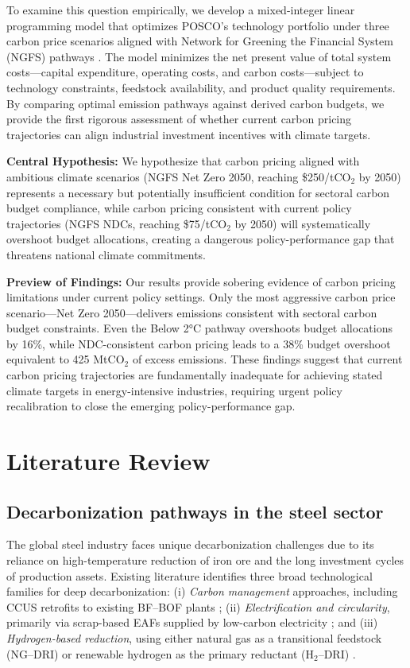 \documentclass[preprint,5p,authoryear]{elsarticle}
\begin{document}
To examine this question empirically, we develop a mixed-integer linear programming model that optimizes POSCO's technology portfolio under three carbon price scenarios aligned with Network for Greening the Financial System (NGFS) pathways \citep{NGFS2024}. The model minimizes the net present value of total system costs—capital expenditure, operating costs, and carbon costs—subject to technology constraints, feedstock availability, and product quality requirements. By comparing optimal emission pathways against derived carbon budgets, we provide the first rigorous assessment of whether current carbon pricing trajectories can align industrial investment incentives with climate targets.

\textbf{Central Hypothesis:} We hypothesize that carbon pricing aligned with ambitious climate scenarios (NGFS Net Zero 2050, reaching \$250/tCO$_2$ by 2050) represents a necessary but potentially insufficient condition for sectoral carbon budget compliance, while carbon pricing consistent with current policy trajectories (NGFS NDCs, reaching \$75/tCO$_2$ by 2050) will systematically overshoot budget allocations, creating a dangerous policy-performance gap that threatens national climate commitments.

\textbf{Preview of Findings:} Our results provide sobering evidence of carbon pricing limitations under current policy settings. Only the most aggressive carbon price scenario—Net Zero 2050—delivers emissions consistent with sectoral carbon budget constraints. Even the Below 2°C pathway overshoots budget allocations by 16\%, while NDC-consistent carbon pricing leads to a 38\% budget overshoot equivalent to 425 MtCO$_2$ of excess emissions. These findings suggest that current carbon pricing trajectories are fundamentally inadequate for achieving stated climate targets in energy-intensive industries, requiring urgent policy recalibration to close the emerging policy-performance gap.

\section{Literature Review}

\subsection{Decarbonization pathways in the steel sector}
The global steel industry faces unique decarbonization challenges due to its reliance on high-temperature reduction of iron ore and the long investment cycles of production assets. Existing literature identifies three broad technological families for deep decarbonization: (i) \emph{Carbon management} approaches, including CCUS retrofits to existing BF--BOF plants \citep{IEA2020steel}; (ii) \emph{Electrification and circularity}, primarily via scrap-based EAFs supplied by low-carbon electricity \citep{materialeconomics2019}; and (iii) \emph{Hydrogen-based reduction}, using either natural gas as a transitional feedstock (NG--DRI) or renewable hydrogen as the primary reductant (H$_2$--DRI) \citep{bell2022hydrogen}. 
\end{document}
